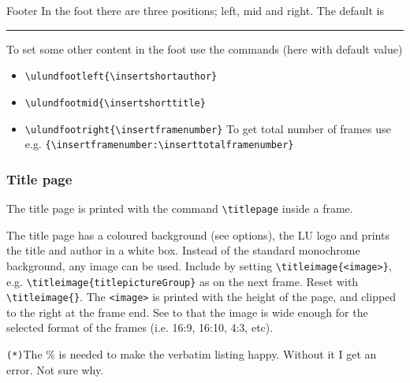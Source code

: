 \documentclass[aspectratio=1610]{beamer}
\begin{document}
\begin{frame}[fragile]{Footer}
  In the foot there are three positions; left, mid and right. The default is
  \par\strut\par
  \rule{2em}{0pt}%
  \par\strut\par
  To set some other content in the foot use the commands (here with default value)
  \begin{itemize}
  \item \verb|\ulundfootleft{\insertshortauthor}|
  \item \verb|\ulundfootmid{\insertshorttitle}|
  \item \verb|\ulundfootright{\insertframenumber}|\newline
    To get total number of frames use e.g. \verb|{\insertframenumber:\inserttotalframenumber}|
  \end{itemize}
\end{frame}

\begin{frame}[fragile]
  \frametitle{Title page}
  The title page is printed with the command \verb|\titlepage| inside a frame.
\begin{CodeBox}{}
\begin{frame}[plain]%
  \titlepage
\end{frame}%
\end{CodeBox}
  
  The title page has a coloured background (see options), the LU logo and prints the title and author in a white box. Instead of the standard monochrome background, any image can be used. Include by setting \verb|\titleimage{<image>}|, e.g. \verb|\titleimage{titlepictureGroup}| as on the next frame. Reset with \verb|\titleimage{}|. The \verb|<image>| is printed with the height of the page, and clipped to the right at the frame end. See to that the image is wide enough for the selected format of the frames (i.e. 16:9, 16:10, 4:3, etc).
 \par\strut\par
 \verb|(*)|{\footnotesize The \% is needed to make the verbatim listing happy. Without it I get an error. Not sure why.}
\end{frame}
\end{document}

